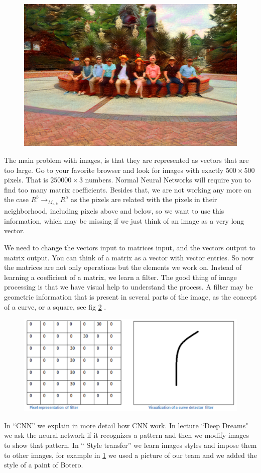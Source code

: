 \documentclass[11pt,letterpaper]{report}
\begin{document}
	
	\begin{figure}[h!]
		\centering
		\includegraphics[width=0.45\linewidth]{figures/botero.png}
		\caption{}
		\label{fig:botero}
	\end{figure} 	
	
	The main problem with images, is that they are represented as vectors that are too large. Go to your favorite browser and look for images with exactly  $500\times500$ pixels. That is $250000\times3$ numbers. Normal Neural Networks will require you to find too many matrix coefficients. Besides that, we are not working any more on the case $R^b\rightarrow_{ M_{a,b}} R^a$ as the pixels are related with the pixels in their neighborhood, including pixels above and below, so we want to use this information, which may be missing if we just think of an image as a very long vector. 
	 
	
	We need to change the vectors input to matrices input,  and the vectors output to matrix output. You can think of a matrix as a vector with vector entries.  So now the matrices are not only operations but the elements we work on.
	Instead of learning a coefficient of a matrix, we learn a filter. The good thing of image processing is that we have visual help to understand the process. A filter may be geometric information that is present in several parts of the image, as the concept of a curve, or a square, see fig \ref{fig:filter} .  
	
	\begin{figure}[h!]
		\centering
		\includegraphics[width=0.45\linewidth]{figures/filter.png}
		\caption{}
		\label{fig:filter}
	\end{figure} 	

	
	In ``CNN'' we explain in more detail how CNN work. In lecture ``Deep Dreams" we ask the neural network if it recognizes a pattern and then we modify images to show that pattern. In `` Style transfer'' we learn images styles and impose them to other images, for example  in \ref{fig:botero} we used a picture of our team and we added the style of a paint of Botero. %
	
\end{document}
